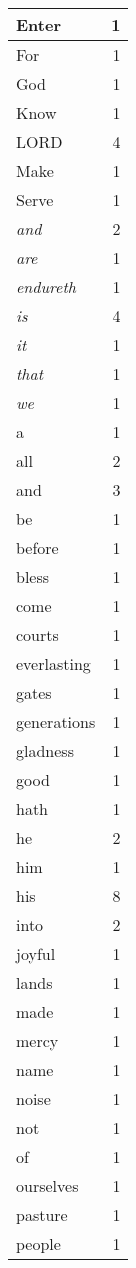 \begin{center}
\begin{longtable}{l|r}
\hline \hline
\endlastfoot
Enter & 1 \\ \hline
For & 1 \\ \hline
God & 1 \\ \hline
Know & 1 \\ \hline
LORD & 4 \\ \hline
Make & 1 \\ \hline
Serve & 1 \\ \hline
\emph{and} & 2 \\ \hline
\emph{are} & 1 \\ \hline
\emph{endureth} & 1 \\ \hline
\emph{is} & 4 \\ \hline
\emph{it} & 1 \\ \hline
\emph{that} & 1 \\ \hline
\emph{we} & 1 \\ \hline
a & 1 \\ \hline
all & 2 \\ \hline
and & 3 \\ \hline
be & 1 \\ \hline
before & 1 \\ \hline
bless & 1 \\ \hline
come & 1 \\ \hline
courts & 1 \\ \hline
everlasting & 1 \\ \hline
gates & 1 \\ \hline
generations & 1 \\ \hline
gladness & 1 \\ \hline
good & 1 \\ \hline
hath & 1 \\ \hline
he & 2 \\ \hline
him & 1 \\ \hline
his & 8 \\ \hline
into & 2 \\ \hline
joyful & 1 \\ \hline
lands & 1 \\ \hline
made & 1 \\ \hline
mercy & 1 \\ \hline
name & 1 \\ \hline
noise & 1 \\ \hline
not & 1 \\ \hline
of & 1 \\ \hline
ourselves & 1 \\ \hline
pasture & 1 \\ \hline
people & 1 \\ \hline

\end{longtable}
\end{center}
